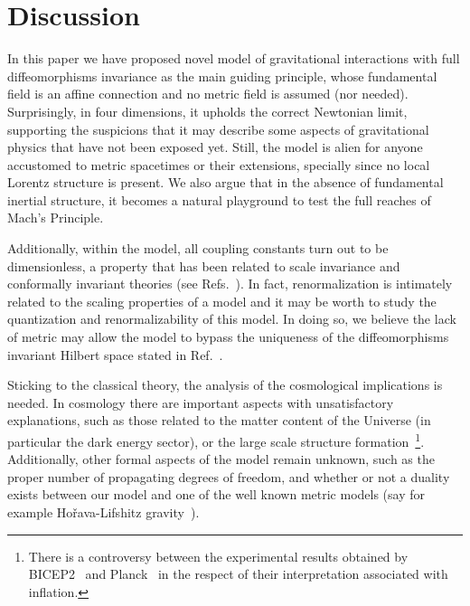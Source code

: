 \documentclass[twocolumn,aps,
  showpacs,showkeys,prd,superscriptaddress]{revtex4-1}
\begin{document}
\section{\label{sec:dis} Discussion}

In this paper we have proposed novel model of gravitational interactions with full diffeomorphisms invariance as the main guiding principle, whose fundamental field is an affine connection and no metric field is assumed (nor needed). Surprisingly, in four dimensions, it upholds the correct Newtonian limit, supporting the suspicions that it may describe some aspects of gravitational physics that have not been exposed yet. Still, the model is alien for anyone accustomed to metric spacetimes or their extensions, specially since no local Lorentz structure is present. We also argue that in the absence of fundamental inertial structure, it becomes a natural playground to test the full reaches of Mach's Principle.

Additionally, within the model, all coupling constants turn out to be dimensionless, a property that has been related to scale invariance and conformally invariant theories (see Refs.~\cite{Buchholz:1976hz,Maldacena:2011mk}). In fact, renormalization is intimately related to the scaling properties of a model and it may be worth to study the quantization and renormalizability of this  model. In doing so, we believe the lack of metric may allow the model to bypass the uniqueness of the diffeomorphisms invariant Hilbert space stated in Ref.~\cite{Lewandowski:2005jk}.

Sticking to the classical theory, the analysis of the cosmological implications is needed. In cosmology there are important aspects with unsatisfactory explanations, such as those related to the matter content of the Universe (in particular the dark energy sector), or the large scale structure formation~\footnote{There is a controversy between the experimental results obtained by BICEP2~\cite{Ade:2014xna} and Planck~\cite{Adam:2014bub} in the respect of their interpretation associated with inflation.}. Additionally, other formal aspects of the model remain unknown, such as the proper number of propagating degrees of freedom, and whether or not a duality exists between our model and one of the well known metric models (say for example Ho\v{r}ava-Lifshitz gravity~\cite{Horava:2009uw,*Sotiriou:2010wn}).
\end{document}
